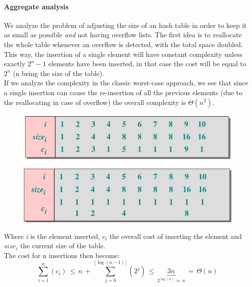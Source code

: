 \documentclass{article}
\begin{document}
		\paragraph{Aggregate analysis}
			We analyze the problem of adjusting the size of an hash table in order to keep it as small as possible \textit{and} not having overflow lists. The first idea is to reallocate the whole table whenever an overflow is detected, with the total space doubled. This way, the insertion of a single element will have constant complexity unless exactly $2^n-1$ elements have been inserted, in that case the cost will be equal to $2^n$ (n being the size of the table).\\
			If we analyze the complexity in the classic worst-case approach, we see that since a single insertion can cause the re-insertion of all the previous elements (due to the reallocating in case of overflow) the overall complexity is $\Theta(n^2)$.
			\begin{figure}[H]
				\centering
				\includegraphics[width = \textwidth]{images/amortized1.png}
			\end{figure}
			\begin{figure}[H]
				\centering
				\includegraphics[width = \textwidth]{images/amortized2.png}
			\end{figure}
			Where \emph{i} is the element inserted, $c_i$ the overall cost of inserting the element and $size_i$ the current size of the table.\\
			The cost for n insertions then become:
			\begin{equation}
				\sum_{i=1}^{n}(c_i)\, \leq\, n\, +\, \sum_{j=0}^{\lfloor \log(n-1) \rfloor}(2^j)\, \leq\, \underbrace{3n}_{2^{\log(n)}\, \approx\, n}\, =\, \Theta(n)
			\end{equation}
\end{document}
